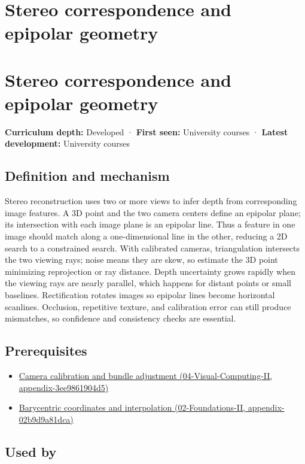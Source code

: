 \hypertarget{appendix-c4e98b6e4001}{}
\section*{Stereo correspondence and epipolar geometry}
\section{Stereo correspondence and epipolar geometry}\label{stereo-correspondence-and-epipolar-geometry}

\textbf{Curriculum depth:} Developed · \textbf{First seen:} University courses · \textbf{Latest development:} University courses

\subsection{Definition and mechanism}\label{definition-and-mechanism}

Stereo reconstruction uses two or more views to infer depth from corresponding image features. A 3D point and the two camera centers define an epipolar plane; its intersection with each image plane is an epipolar line. Thus a feature in one image should match along a one-dimensional line in the other, reducing a 2D search to a constrained search. With calibrated cameras, triangulation intersects the two viewing rays; noise means they are skew, so estimate the 3D point minimizing reprojection or ray distance. Depth uncertainty grows rapidly when the viewing rays are nearly parallel, which happens for distant points or small baselines. Rectification rotates images so epipolar lines become horizontal scanlines. Occlusion, repetitive texture, and calibration error can still produce mismatches, so confidence and consistency checks are essential.

\subsection{Prerequisites}\label{prerequisites}

\begin{itemize}
\tightlist
\item
  \href{}{Camera calibration and bundle adjustment (04-Visual-Computing-II, appendix-3ee9861904d5)}
\item
  \href{}{Barycentric coordinates and interpolation (02-Foundations-II, appendix-02b9d9a81dca)}
\end{itemize}

\subsection{Used by}\label{used-by}

